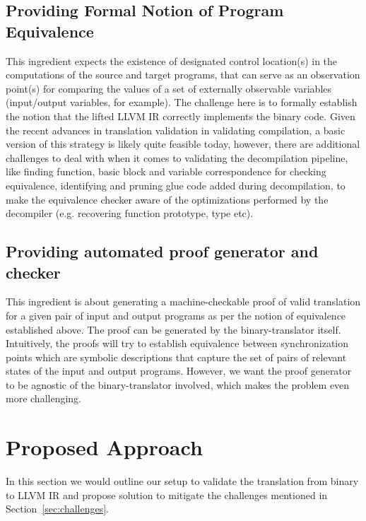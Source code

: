 \subsection{Providing Formal Notion of Program Equivalence} This ingredient
expects the existence of designated control location(s) in the computations of
the source and target programs, that can serve as an observation point(s) for
comparing the values of a set of externally observable variables (input/output
    variables, for example). The challenge here is to formally establish the
notion that the lifted LLVM IR  correctly implements the \ISA binary code.
Given the recent advances in translation validation in validating compilation,
      a basic version of this strategy is likely quite feasible today, however,
      there are additional challenges to deal with when it comes to validating
      the decompilation pipeline, like finding function, basic block and
      variable correspondence for checking equivalence, identifying and pruning
      glue code added during decompilation, to make the equivalence checker
      aware of the optimizations performed by the decompiler (e.g.  recovering
          function prototype, type etc).

\subsection{Providing automated proof generator and checker} This ingredient is
about generating a machine-checkable proof  of valid translation for a given
pair of input and output programs as per the notion of equivalence established
above. The proof can be generated by  the binary-translator itself.
Intuitively, the proofs will try to establish equivalence between
synchronization points which are symbolic descriptions that capture the set of
pairs of relevant states of the input and output programs. However, we want the
proof generator to be agnostic of the binary-translator involved, which makes
the problem  even more challenging.


\section{Proposed Approach}\label{sec:approach} In this section we would
outline our setup to validate the translation from binary to LLVM IR and
propose solution to mitigate the challenges mentioned in
Section~\ref{sec:challenges}.


